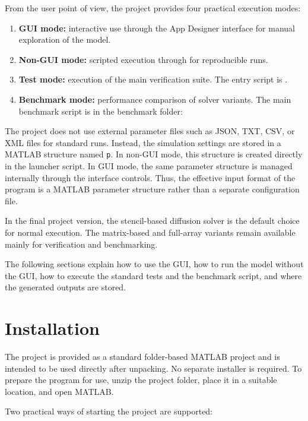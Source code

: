 From the user point of view, the project provides four practical execution modes:

\begin{enumerate}
    \item \textbf{GUI mode:} interactive use through the App Designer interface for manual exploration of the model.
    \item \textbf{Non-GUI mode:} scripted execution through  for reproducible runs.
    \item \textbf{Test mode:} execution of the main verification suite. The entry script is .
    \item \textbf{Benchmark mode:} performance comparison of solver variants. The main benchmark script is in the benchmark folder:
    
\end{enumerate}

The project does not use external parameter files such as JSON, TXT, CSV, or XML files for standard runs. Instead, the simulation settings are stored in a MATLAB structure named \texttt{p}. In non-GUI mode, this structure is created directly in the launcher script. In GUI mode, the same parameter structure is managed internally through the interface controls. Thus, the effective input format of the program is a MATLAB parameter structure rather than a separate configuration file.

In the final project version, the stencil-based diffusion solver is the default choice for normal execution. The matrix-based and full-array variants remain available mainly for verification and benchmarking.

The following sections explain how to use the GUI, how to run the model without the GUI, how to execute the standard tests and the benchmark script, and where the generated outputs are stored.

\section{Installation}
\label{sec:manual_installation}

The project is provided as a standard folder-based MATLAB project and is intended to be used directly after unpacking. No separate installer is required. To prepare the program for use, unzip the project folder, place it in a suitable location, and open MATLAB.

Two practical ways of starting the project are supported:

